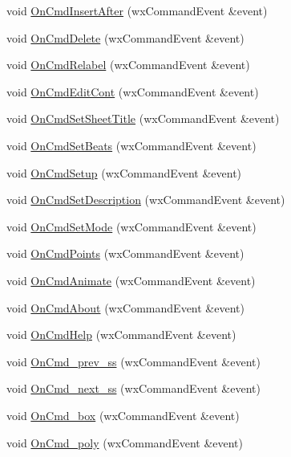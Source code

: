 \begin{DoxyCompactItemize}
\item 
void \hyperlink{a00102_a22ea6017bca421340108a2dbc2d996d0}{On\-Cmd\-Insert\-After} (wx\-Command\-Event \&event)
\item 
void \hyperlink{a00102_aeaeb50a786d6b67265ebd16ca84fb10f}{On\-Cmd\-Delete} (wx\-Command\-Event \&event)
\item 
void \hyperlink{a00102_a1f2014d699e4474df95b4877eadfd10c}{On\-Cmd\-Relabel} (wx\-Command\-Event \&event)
\item 
void \hyperlink{a00102_afcdd645360b5c9713915d299c03e1a94}{On\-Cmd\-Edit\-Cont} (wx\-Command\-Event \&event)
\item 
void \hyperlink{a00102_ae39a64f6d59882d54d55c6506e7e1f0e}{On\-Cmd\-Set\-Sheet\-Title} (wx\-Command\-Event \&event)
\item 
void \hyperlink{a00102_ad0b01757c0ba1a757385e833bc12f612}{On\-Cmd\-Set\-Beats} (wx\-Command\-Event \&event)
\item 
void \hyperlink{a00102_a8af3f4a965f39880faadd356097b8e1e}{On\-Cmd\-Setup} (wx\-Command\-Event \&event)
\item 
void \hyperlink{a00102_a1a3bd1a04bfb1e9af9ed2ebe2a028a34}{On\-Cmd\-Set\-Description} (wx\-Command\-Event \&event)
\item 
void \hyperlink{a00102_a18fe31c2f906dffc6543863fd8b23d2f}{On\-Cmd\-Set\-Mode} (wx\-Command\-Event \&event)
\item 
void \hyperlink{a00102_afb6331861edfd2b2568d417a5996c396}{On\-Cmd\-Points} (wx\-Command\-Event \&event)
\item 
void \hyperlink{a00102_a364c8ffdab31473f9b14865aaa7fe9a6}{On\-Cmd\-Animate} (wx\-Command\-Event \&event)
\item 
void \hyperlink{a00102_a93083f70ffaaaa1fd52bc675c64a91d2}{On\-Cmd\-About} (wx\-Command\-Event \&event)
\item 
void \hyperlink{a00102_a6855f113fd31fbc3430ca17786c1392f}{On\-Cmd\-Help} (wx\-Command\-Event \&event)
\item 
void \hyperlink{a00102_a9684bee05852375299fa48533c60c777}{On\-Cmd\-\_\-prev\-\_\-ss} (wx\-Command\-Event \&event)
\item 
void \hyperlink{a00102_a5706a45aad6c19fa12648c49ef5f6a40}{On\-Cmd\-\_\-next\-\_\-ss} (wx\-Command\-Event \&event)
\item 
void \hyperlink{a00102_aca4b18460590d745b2e8513ae42f1b9a}{On\-Cmd\-\_\-box} (wx\-Command\-Event \&event)
\item 
void \hyperlink{a00102_a3c37f4fa3869a7d1a8ec082e1212cad8}{On\-Cmd\-\_\-poly} (wx\-Command\-Event \&event)

\end{DoxyCompactItemize}
